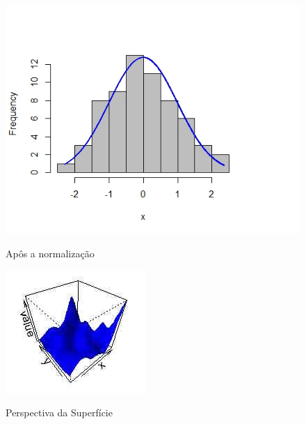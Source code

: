  			\begin{minipage}[t!]{0.31\textwidth}
 				
 				\begin{figure}[H]
 					\centering \small \caption{Apôs a normalização}
 					\includegraphics[width=0.97\linewidth]{FIGURAS/RplotMELNHOR}
 					\label{fig:RplotMELNHOR}
 				\end{figure}			
 				
 			\end{minipage} 
 			\begin{minipage}[t!]{0.31\textwidth}
 				
 				\begin{figure}[H]
 					\centering \small \caption{Perspectiva da Superfície}
 					\includegraphics[width=0.97\linewidth]{FIGURAS/RplotP34}
 					\label{fig:RplotP34}
 				\end{figure}		
 			\end{minipage} 
 			
